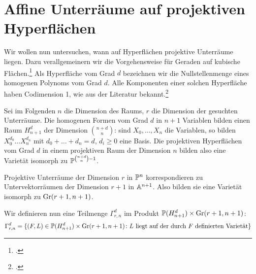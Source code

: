 \section{Affine Unterräume auf projektiven Hyperflächen} \label{sec:linesproj}
Wir wollen nun untersuchen, wann auf Hyperflächen projektive Unterräume liegen. Dazu verallgemeinern wir die Vorgehensweise für Geraden auf kubische Flächen.\footcite[siehe][S.~78ff]{Shafarevich} Als Hyperfläche vom Grad $d$ bezeichnen wir die Nullstellenmenge eines homogenen Polynoms vom Grad $d$. Alle Komponenten einer solchen Hyperfläche haben Codimension 1, wie aus der Literatur bekannt.\footcite[siehe][S.~74, Theorem~4]{Shafarevich}

Sei im Folgenden $n$ die Dimension des Raums, $r$ die Dimension der gesuchten Unterräume. Die homogenen Formen vom Grad $d$ in $n+1$ Variablen bilden einen Raum $H_{n+1}^d$ der Dimension $\binom{n+d}{n}$: sind $X_0, \dots, X_n$ die Variablen, so bilden $X_0^{d_0} \dots X_n^{d_n}$ mit $d_0 + \dots + d_n = d$, $d_i \geq 0$ eine Basis. Die projektiven Hyperflächen vom Grad $d$ in einem projektiven Raum der Dimension $n$ bilden also eine Varietät isomorph zu $\mathbb P^{\binom{n+d}{n} - 1}$.

Projektive Unterräume der Dimension $r$ in $\mathbb P^{n}$ korrespondieren zu Untervektorräumen der Dimension $r+1$ in $\mathbb A^{n+1}$. Also bilden sie eine Varietät isomorph zu $\grass r+1/{n+1}$.

Wir definieren nun eine Teilmenge $\Gamma_{r,n}^d$ im Produkt $\mathbb P(H_{n+1}^d) \times \grass r+1/{n+1}$:
\begin{equation}
\Gamma_{r,n}^d = \{(F,L) \in \mathbb P(H_{n+1}^d) \times \grass r+1/{n+1} \colon \text{$L$ liegt auf der durch $F$ definierten Varietät} \}
\end{equation}

